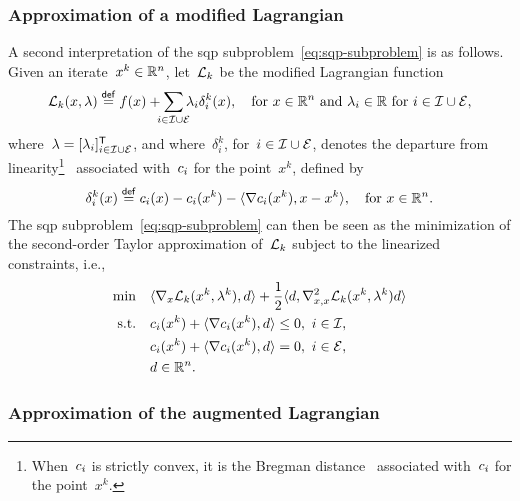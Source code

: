 \subsubsection{Approximation of a modified Lagrangian}

A second interpretation of the \gls{sqp} subproblem~\cref{eq:sqp-subproblem} is as follows.
Given an iterate~$x^k \in \mathbb{R}^n$, let~$\lag[k]$ be the modified Lagrangian function
\begin{equation*}
    \lag[k](x, \lambda) \eqdef \obj(x) + \sum_{\mathclap{i \in \iub \cup \ieq}} \lambda_i \delta_i^k(x), \quad \text{for~$x \in \R^n$ and~$\lambda_i \in \R$ for~$i \in \iub \cup \ieq$},
\end{equation*}
where~$\lambda = [\lambda_i]_{i \in \mathcal{I} \cup \mathcal{E}}^{\mathsf{T}}$, and where~$\delta_i^k$, for~$i \in \mathcal{I} \cup \mathcal{E}$, denotes the departure from linearity\footnote{When~$c_{i}$ is strictly convex, it is the Bregman distance~\cite{Bregman_1967} associated with~$c_{i}$ for the point~$x^k$.}~\cite{Robinson_1972,Hoek_1982} associated with~$c_{i}$ for the point~$x^k$, defined by
\begin{equation*}
    \delta_i^k(x) \mathrel{\stackrel{\mathsf{def}}{=}} c_{i}(x) - c_{i}(x^k) - \langle\nabla c_{i}(x^k), x - x^k\rangle, \quad \text{for~$x \in \mathbb{R}^n$.}
\end{equation*}
The \gls{sqp} subproblem~\cref{eq:sqp-subproblem} can then be seen as the minimization of the second-order Taylor approximation of~$\lag[k]$ subject to the linearized constraints, i.e.,
\begin{align}
    \min        & \quad \inner{\nabla_x \lag[k](x^k, \lambda^k), d} + \frac{1}{2} \inner{d, \nabla_{x, x}^2 \lag[k](x^k, \lambda^k) d}\\
    \text{s.t.} & \quad \con{i}(x^k) + \inner{\nabla \con{i}(x^k), d} \le 0, ~ i \in \iub,\\
                & \quad \con{i}(x^k) + \inner{\nabla \con{i}(x^k), d} = 0, ~ i \in \ieq,\\
                & \quad d \in \R^n.
\end{align}

\subsubsection{Approximation of the augmented Lagrangian}


